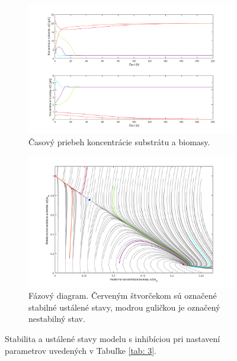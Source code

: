 \begin{figure}
	\begin{subfigure}{.5\textwidth}
		\centering
		\includegraphics[width=1\linewidth]{images/init_cond_inhb}
		\caption[]{Časový priebeh koncentrácie substrátu a biomasy.}
	\end{subfigure}
	\begin{subfigure}{.5\textwidth}
		\centering
		\includegraphics[width=1\linewidth]{images/phase_inhb}
		\caption[]{Fázový diagram. Červeným štvorčekom sú označené stabilné ustálené stavy, modrou guličkou je označený nestabilný stav.}
	\end{subfigure}
	\caption{Stabilita a ustálené stavy modelu s inhibíciou pri nastavení parametrov uvedených v Tabuľke \ref{tab: 3}.}
	\label{fig:5}
\end{figure}

